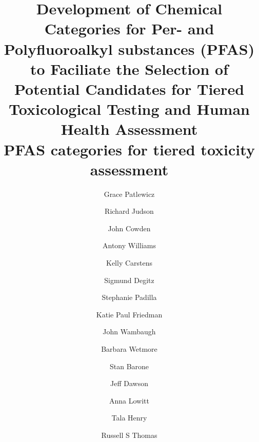 \documentclass[
  super,
  preprint,
  3p]{elsarticle}
\begin{document}
\begin{frontmatter}
\title{Development of Chemical Categories for Per- and Polyfluoroalkyl
substances (PFAS) to Faciliate the Selection of Potential Candidates for
Tiered Toxicological Testing and Human Health Assessment \\\large{PFAS
categories for tiered toxicity assessment} }
\author[1]{Grace Patlewicz%
%
}
\author[1]{Richard Judson%
%
}

\author[1]{John Cowden%
%
}

\author[1]{Antony Williams%
%
}

\author[1]{Kelly Carstens%
%
}

\author[1]{Sigmund Degitz%
%
}

\author[1]{Stephanie Padilla%
%
}

\author[1]{Katie Paul Friedman%
%
}

\author[1]{John Wambaugh%
%
}

\author[1]{Barbara Wetmore%
%
}

\author[2]{Stan Barone%
%
}

\author[2]{Jeff Dawson%
%
}

\author[2]{Anna Lowitt%
%
}

\author[2]{Tala Henry%
%
}

\author[1]{Russell S Thomas%
%
}



















\end{frontmatter}
\end{document}

